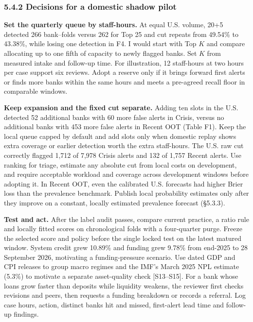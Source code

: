 \documentclass[
  12pt,
  a4paper,
]{article}
\begin{document}
\newpage

\subsubsection{5.4.2 Decisions for a domestic shadow
pilot}\label{decisions-for-a-domestic-shadow-pilot}

\textbf{Set the quarterly queue by staff-hours.} At equal U.S. volume,
20+5 detected 266 bank--folds versus 262 for Top 25 and cut repeats from
49.54\% to 43.38\%, while losing one detection in F4. I would start with
Top \(K\) and compare allocating up to one fifth of capacity to newly
flagged banks. Set \(K\) from measured intake and follow-up time. For
illustration, 12 staff-hours at two hours per case support six reviews.
Adopt a reserve only if it brings forward first alerts or finds more
banks within the same hours and meets a pre-agreed recall floor in
comparable windows.

\textbf{Keep expansion and the fixed cut separate.} Adding ten slots in
the U.S. detected 52 additional banks with 60 more false alerts in
Crisis, versus no additional banks with 453 more false alerts in Recent
OOT (Table F1). Keep the local queue capped by default and add slots
only when domestic replay shows extra coverage or earlier detection
worth the extra staff-hours. The U.S. raw cut correctly flagged 1,712 of
7,978 Crisis alerts and 132 of 1,757 Recent alerts. Use ranking for
triage, estimate any absolute cut from local costs on development, and
require acceptable workload and coverage across development windows
before adopting it. In Recent OOT, even the calibrated U.S. forecasts
had higher Brier loss than the prevalence benchmark. Publish local
probability estimates only after they improve on a constant, locally
estimated prevalence forecast (§5.3.3).

\textbf{Test and act.} After the label audit passes, compare current
practice, a ratio rule and locally fitted scores on chronological folds
with a four-quarter purge. Freeze the selected score and policy before
the single locked test on the latest matured window. System credit grew
10.89\% and funding grew 9.78\% from end-2025 to 28 September 2026,
motivating a funding-pressure scenario. Use dated GDP and CPI releases
to group macro regimes and the IMF's March 2025 NPL estimate (5.3\%) to
motivate a separate asset-quality check {[}S13--S15{]}. For a bank whose
loans grow faster than deposits while liquidity weakens, the reviewer
first checks revisions and peers, then requests a funding breakdown or
records a referral. Log case hours, action, distinct banks hit and
missed, first-alert lead time and follow-up findings.
\end{document}
